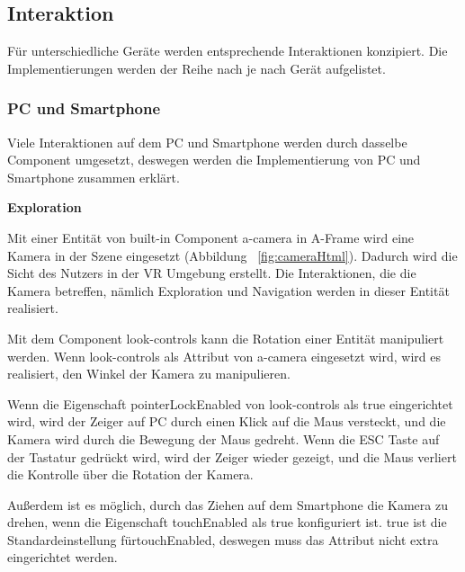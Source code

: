  \subsection{Interaktion}
  Für unterschiedliche Geräte werden entsprechende Interaktionen konzipiert. Die Implementierungen werden der Reihe nach je nach Gerät aufgelistet.
  
  \subsubsection{PC und Smartphone}
  Viele Interaktionen auf dem PC und Smartphone werden durch dasselbe Component umgesetzt, deswegen werden die Implementierung von PC und Smartphone zusammen erklärt.
  
  \vspace{1em}
  \noindent
  \textbf{Exploration}
  \vspace{1em}
  
  \noindent
  Mit einer Entität von built-in Component {\selectfont a-camera} in A-Frame wird eine Kamera in der Szene eingesetzt (Abbildung ~\ref{fig:cameraHtml}). Dadurch wird die Sicht des Nutzers in der VR Umgebung erstellt. Die Interaktionen, die die Kamera betreffen, nämlich Exploration und Navigation werden in dieser Entität realisiert.
  
  Mit dem Component {\selectfont look-controls} kann die Rotation einer Entität manipuliert werden. Wenn {\selectfont look-controls} als Attribut von {\selectfont a-camera} eingesetzt wird, wird es realisiert, den Winkel der Kamera zu manipulieren.
  
  Wenn die Eigenschaft {\selectfont pointerLockEnabled} von {\selectfont look-controls}  als {\selectfont true} eingerichtet wird, wird der Zeiger auf PC durch einen Klick auf die Maus versteckt, und die Kamera wird durch die Bewegung der Maus gedreht. Wenn die ESC Taste auf der Tastatur gedrückt wird, wird der Zeiger wieder gezeigt, und die Maus verliert die Kontrolle über die Rotation der Kamera.
  
  Außerdem ist es möglich, durch das Ziehen auf dem Smartphone die Kamera zu drehen, wenn die Eigenschaft {\selectfont touchEnabled} als {\selectfont true} konfiguriert ist. {\selectfont true} ist die Standardeinstellung für{\selectfont touchEnabled}, deswegen muss das Attribut nicht extra eingerichtet werden.
  
